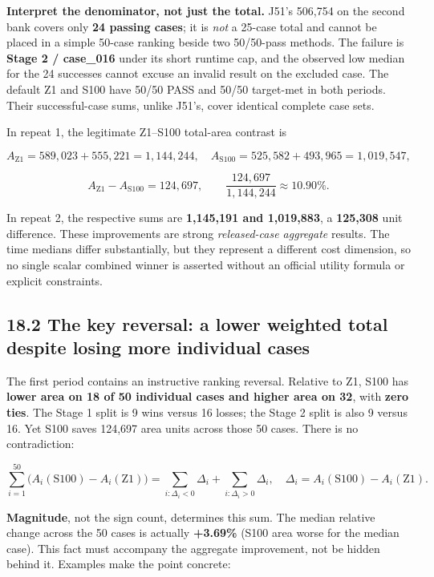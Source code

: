 \documentclass[a4paper,10pt]{article}
\theoremstyle{definition}
\theoremstyle{remark}
\begin{document}
\textbf{Interpret the denominator, not just the total.} J51's 506,754 on the second bank covers only \textbf{24 passing cases}; it is \emph{not} a 25-case total and cannot be placed in a simple 50-case ranking beside two 50/50-pass methods. The failure is \textbf{Stage 2 / case\_016} under its short runtime cap, and the observed low median for the 24 successes cannot excuse an invalid result on the excluded case. The default Z1 and S100 have 50/50 PASS and 50/50 target-met in both periods. Their successful-case sums, unlike J51's, cover identical complete case sets.

In repeat 1, the legitimate Z1--S100 total-area contrast is

\[
A_{\mathrm{Z1}}=589{,}023+555{,}221=1{,}144{,}244,
\quad A_{\mathrm{S100}}=525{,}582+493{,}965=1{,}019{,}547,
\]

\[
A_{\mathrm{Z1}}-A_{\mathrm{S100}}=124{,}697,
\qquad \frac{124{,}697}{1{,}144{,}244}\approx 10.90\%.
\]

In repeat 2, the respective sums are \textbf{1,145,191 and 1,019,883}, a \textbf{125,308} unit difference. These improvements are strong \emph{released-case aggregate} results. The time medians differ substantially, but they represent a different cost dimension, so no single scalar combined winner is asserted without an official utility formula or explicit constraints.

\subsection{18.2 The key reversal: a lower weighted total despite losing more individual cases}\label{the-key-reversal-a-lower-weighted-total-despite-losing-more-individual-cases}

The first period contains an instructive ranking reversal. Relative to Z1, S100 has \textbf{lower area on 18 of 50 individual cases and higher area on 32}, with \textbf{zero ties}. The Stage 1 split is 9 wins versus 16 losses; the Stage 2 split is also 9 versus 16. Yet S100 saves 124,697 area units across those 50 cases. There is no contradiction:

\[
\sum_{i=1}^{50}\bigl(A_i(\mathrm{S100})-A_i(\mathrm{Z1})\bigr)
= \sum_{i:\Delta_i<0}\Delta_i+\sum_{i:\Delta_i>0}\Delta_i,
\quad\Delta_i=A_i(\mathrm{S100})-A_i(\mathrm{Z1}).
\]

\textbf{Magnitude}, not the sign count, determines this sum. The median relative change across the 50 cases is actually \textbf{+3.69\%} (S100 area worse for the median case). This fact must accompany the aggregate improvement, not be hidden behind it. Examples make the point concrete:
\end{document}

